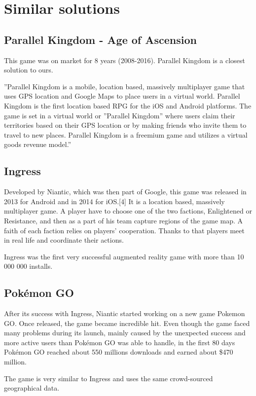 
\section{Similar solutions}

	\subsection{Parallel Kingdom - Age of Ascension}
	This game was on market for 8 years (2008-2016). Parallel Kingdom is a closest solution to ours.
	
	
	”Parallel Kingdom is a mobile, location based, massively multiplayer game that uses GPS
	location and Google Maps to place users in a virtual world. Parallel Kingdom is the first
	location based RPG for the iOS and Android platforms. The game is set in a virtual world
	or ”Parallel Kingdom” where users claim their territories based on their GPS location or by making friends who invite them to travel to new places. Parallel Kingdom is a freemium
	game and utilizes a virtual goods revenue model.”
	
	\subsection{Ingress}
	Developed by Niantic, which was then part of Google, this game was released in 2013 for
	Android and in 2014 for iOS.[4] It is a location based, massively multiplayer game. A player have to choose one of the two factions, Enlightened or Resistance, and then as a part of his 	team capture regions of the game map. A faith of each faction relies on players’ cooperation. Thanks to that players meet in real life and coordinate their actions.
	
	Ingress was the first very successful augmented reality game with more than 10 000 000
	installs.
	
	\subsection{Pokémon GO}
	After its success with Ingress, Niantic started working on a new game Pokemon GO. Once
	released, the game became incredible hit. Even though the game faced many problems during
	its launch, mainly caused by the unexpected success and more active users than Pokémon
	GO was able to handle, in the first 80 days Pokémon GO reached about 550 millions downloads and earned about \$470 million.
	
	The game is very similar to Ingress and uses the same crowd-sourced geographical data.
	
